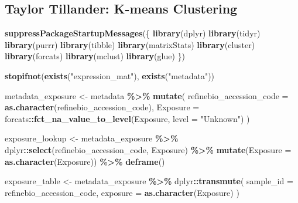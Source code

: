 \documentclass[
]{article}
\newenvironment{Shaded}{\begin{snugshade}}{\end{snugshade}}
\newcommand{\AttributeTok}[1]{\textcolor[rgb]{0.13,0.29,0.53}{#1}}
\newcommand{\FunctionTok}[1]{\textcolor[rgb]{0.13,0.29,0.53}{\textbf{#1}}}
\newcommand{\NormalTok}[1]{#1}
\newcommand{\OtherTok}[1]{\textcolor[rgb]{0.56,0.35,0.01}{#1}}
\newcommand{\SpecialCharTok}[1]{\textcolor[rgb]{0.81,0.36,0.00}{\textbf{#1}}}
\newcommand{\StringTok}[1]{\textcolor[rgb]{0.31,0.60,0.02}{#1}}
\begin{document}
\subsection{Taylor Tillander: K-means
Clustering}\label{taylor-tillander-k-means-clustering}

\begin{Shaded}
\begin{Highlighting}[]
\FunctionTok{suppressPackageStartupMessages}\NormalTok{(\{}
    \FunctionTok{library}\NormalTok{(dplyr)}
    \FunctionTok{library}\NormalTok{(tidyr)}
    \FunctionTok{library}\NormalTok{(purrr)}
    \FunctionTok{library}\NormalTok{(tibble)}
    \FunctionTok{library}\NormalTok{(matrixStats)}
    \FunctionTok{library}\NormalTok{(cluster)}
    \FunctionTok{library}\NormalTok{(forcats)}
    \FunctionTok{library}\NormalTok{(mclust)}
    \FunctionTok{library}\NormalTok{(glue)}
\NormalTok{\})}

\FunctionTok{stopifnot}\NormalTok{(}\FunctionTok{exists}\NormalTok{(}\StringTok{"expression\_mat"}\NormalTok{), }\FunctionTok{exists}\NormalTok{(}\StringTok{"metadata"}\NormalTok{))}

\NormalTok{metadata\_exposure }\OtherTok{\textless{}{-}}\NormalTok{ metadata }\SpecialCharTok{\%\textgreater{}\%}
    \FunctionTok{mutate}\NormalTok{(}
        \AttributeTok{refinebio\_accession\_code =} \FunctionTok{as.character}\NormalTok{(refinebio\_accession\_code),}
        \AttributeTok{Exposure =}\NormalTok{ forcats}\SpecialCharTok{::}\FunctionTok{fct\_na\_value\_to\_level}\NormalTok{(Exposure, }\AttributeTok{level =} \StringTok{"Unknown"}\NormalTok{)}
\NormalTok{    )}

\NormalTok{exposure\_lookup }\OtherTok{\textless{}{-}}\NormalTok{ metadata\_exposure }\SpecialCharTok{\%\textgreater{}\%}
\NormalTok{  dplyr}\SpecialCharTok{::}\FunctionTok{select}\NormalTok{(refinebio\_accession\_code, Exposure) }\SpecialCharTok{\%\textgreater{}\%}
  \FunctionTok{mutate}\NormalTok{(}\AttributeTok{Exposure =} \FunctionTok{as.character}\NormalTok{(Exposure)) }\SpecialCharTok{\%\textgreater{}\%}
  \FunctionTok{deframe}\NormalTok{()}


\NormalTok{exposure\_table }\OtherTok{\textless{}{-}}\NormalTok{ metadata\_exposure }\SpecialCharTok{\%\textgreater{}\%}
\NormalTok{  dplyr}\SpecialCharTok{::}\FunctionTok{transmute}\NormalTok{(}
        \AttributeTok{sample\_id =}\NormalTok{ refinebio\_accession\_code,}
        \AttributeTok{exposure =} \FunctionTok{as.character}\NormalTok{(Exposure)}
\NormalTok{    )}


\end{Highlighting}
\end{Shaded}
\end{document}
